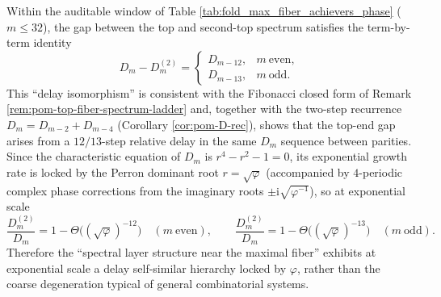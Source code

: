 \begin{remark}\label{rem:pom-max-fiber-gap-delay-12-13}
Within the auditable window of Table \ref{tab:fold_max_fiber_achievers_phase} (\(m\le 32\)), the gap between the top and second-top spectrum satisfies the term-by-term identity
\[
D_m-D_m^{(2)}=
\begin{cases}
D_{m-12}, & m\ \text{even},\\
D_{m-13}, & m\ \text{odd}.
\end{cases}
\]
This ``delay isomorphism'' is consistent with the Fibonacci closed form of Remark \ref{rem:pom-top-fiber-spectrum-ladder} and, together with the two-step recurrence \(D_m=D_{m-2}+D_{m-4}\) (Corollary \ref{cor:pom-D-rec}), shows that the top-end gap arises from a \(12/13\)-step relative delay in the same \(D_m\) sequence between parities.
Since the characteristic equation of \(D_m\) is \(r^4-r^2-1=0\), its exponential growth rate is locked by the Perron dominant root \(r=\sqrt\varphi\) (accompanied by \(4\)-periodic complex phase corrections from the imaginary roots \(\pm\mathrm{i}\sqrt{\varphi^{-1}}\)), so at exponential scale
\[
\frac{D_m^{(2)}}{D_m}
=1-\Theta\!\bigl((\sqrt\varphi)^{-12}\bigr)\quad(m\ \text{even}),
\qquad
\frac{D_m^{(2)}}{D_m}
=1-\Theta\!\bigl((\sqrt\varphi)^{-13}\bigr)\quad(m\ \text{odd}).
\]
Therefore the ``spectral layer structure near the maximal fiber'' exhibits at exponential scale a delay self-similar hierarchy locked by \(\varphi\), rather than the coarse degeneration typical of general combinatorial systems.
\end{remark}


